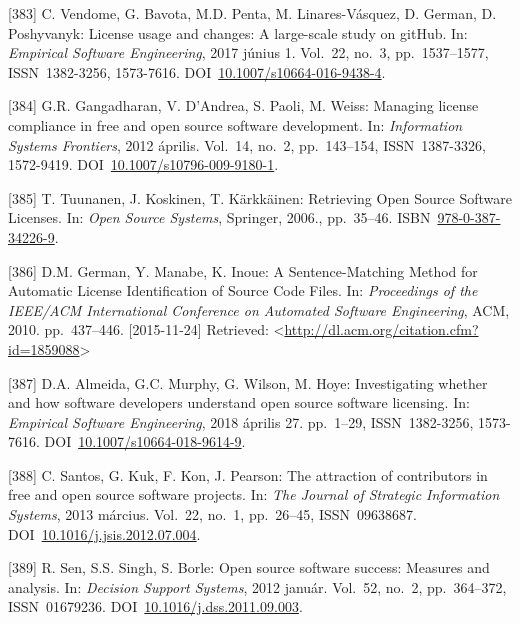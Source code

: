 \documentclass[12pt,magyar,a4paper,oneside]{scrreprt}
\begin{document}
\leavevmode\hypertarget{ref-vendome_license_2017}{}%
{[}383{]} C. Vendome, G. Bavota, M.D. Penta, M. Linares-Vásquez, D.
German, D. Poshyvanyk: License usage and changes: A large-scale study on
gitHub. In: \emph{Empirical Software Engineering}, 2017 június 1.
Vol.~22, no.~3, pp.~1537--1577, ISSN~1382-3256, 1573-7616.
DOI~\href{https://doi.org/10.1007/s10664-016-9438-4}{10.1007/s10664-016-9438-4}.

\leavevmode\hypertarget{ref-gangadharan_managing_2012}{}%
{[}384{]} G.R. Gangadharan, V. D'Andrea, S. Paoli, M. Weiss: Managing
license compliance in free and open source software development. In:
\emph{Information Systems Frontiers}, 2012 április. Vol.~14, no.~2,
pp.~143--154, ISSN~1387-3326, 1572-9419.
DOI~\href{https://doi.org/10.1007/s10796-009-9180-1}{10.1007/s10796-009-9180-1}.

\leavevmode\hypertarget{ref-tuunanen_retrieving_2006}{}%
{[}385{]} T. Tuunanen, J. Koskinen, T. Kärkkäinen: Retrieving Open
Source Software Licenses. In: \emph{Open Source Systems}, Springer,
2006., pp.~35--46.
ISBN~\href{https://worldcat.org/isbn/978-0-387-34226-9}{978-0-387-34226-9}.

\leavevmode\hypertarget{ref-german_sentence-matching_2010}{}%
{[}386{]} D.M. German, Y. Manabe, K. Inoue: A Sentence-Matching Method
for Automatic License Identification of Source Code Files. In:
\emph{Proceedings of the IEEE/ACM International Conference on Automated
Software Engineering}, ACM, 2010. pp.~437--446. {[}2015-11-24{]}
Retrieved:
\textless{}\url{http://dl.acm.org/citation.cfm?id=1859088}\textgreater{}

\leavevmode\hypertarget{ref-almeida_investigating_2018}{}%
{[}387{]} D.A. Almeida, G.C. Murphy, G. Wilson, M. Hoye: Investigating
whether and how software developers understand open source software
licensing. In: \emph{Empirical Software Engineering}, 2018 április 27.
pp.~1--29, ISSN~1382-3256, 1573-7616.
DOI~\href{https://doi.org/10.1007/s10664-018-9614-9}{10.1007/s10664-018-9614-9}.

\leavevmode\hypertarget{ref-santos_attraction_2013}{}%
{[}388{]} C. Santos, G. Kuk, F. Kon, J. Pearson: The attraction of
contributors in free and open source software projects. In: \emph{The
Journal of Strategic Information Systems}, 2013 március. Vol.~22, no.~1,
pp.~26--45, ISSN~09638687.
DOI~\href{https://doi.org/10.1016/j.jsis.2012.07.004}{10.1016/j.jsis.2012.07.004}.

\leavevmode\hypertarget{ref-sen_open_2012}{}%
{[}389{]} R. Sen, S.S. Singh, S. Borle: Open source software success:
Measures and analysis. In: \emph{Decision Support Systems}, 2012 január.
Vol.~52, no.~2, pp.~364--372, ISSN~01679236.
DOI~\href{https://doi.org/10.1016/j.dss.2011.09.003}{10.1016/j.dss.2011.09.003}.
\end{document}

